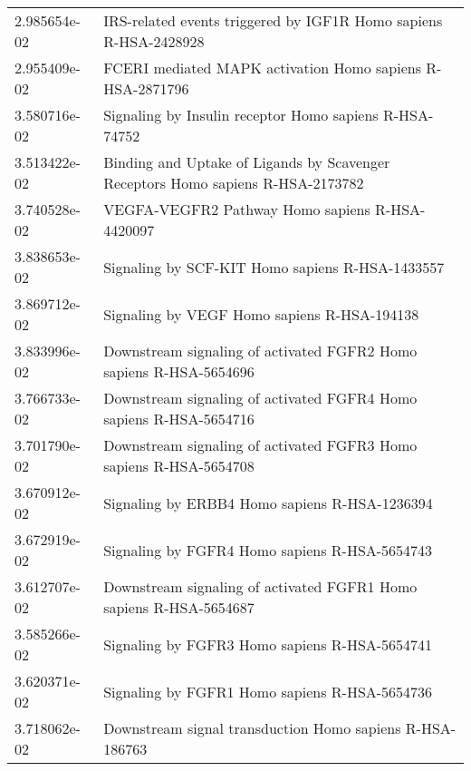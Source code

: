 \begin{longtable}{p{2.4cm}p{14.5cm}}
             2.985654e-02 &                              IRS-related events triggered by IGF1R Homo sapiens R-HSA-2428928 \\
             2.955409e-02 &                                     FCERI mediated MAPK activation Homo sapiens R-HSA-2871796 \\
             3.580716e-02 &                                        Signaling by Insulin receptor Homo sapiens R-HSA-74752 \\
             3.513422e-02 &               Binding and Uptake of Ligands by Scavenger Receptors Homo sapiens R-HSA-2173782 \\
             3.740528e-02 &                                               VEGFA-VEGFR2 Pathway Homo sapiens R-HSA-4420097 \\
             3.838653e-02 &                                               Signaling by SCF-KIT Homo sapiens R-HSA-1433557 \\
             3.869712e-02 &                                                   Signaling by VEGF Homo sapiens R-HSA-194138 \\
             3.833996e-02 &                            Downstream signaling of activated FGFR2 Homo sapiens R-HSA-5654696 \\
             3.766733e-02 &                            Downstream signaling of activated FGFR4 Homo sapiens R-HSA-5654716 \\
             3.701790e-02 &                            Downstream signaling of activated FGFR3 Homo sapiens R-HSA-5654708 \\
             3.670912e-02 &                                                 Signaling by ERBB4 Homo sapiens R-HSA-1236394 \\
             3.672919e-02 &                                                 Signaling by FGFR4 Homo sapiens R-HSA-5654743 \\
             3.612707e-02 &                            Downstream signaling of activated FGFR1 Homo sapiens R-HSA-5654687 \\
             3.585266e-02 &                                                 Signaling by FGFR3 Homo sapiens R-HSA-5654741 \\
             3.620371e-02 &                                                 Signaling by FGFR1 Homo sapiens R-HSA-5654736 \\
             3.718062e-02 &                                      Downstream signal transduction Homo sapiens R-HSA-186763 \\

\end{longtable}
